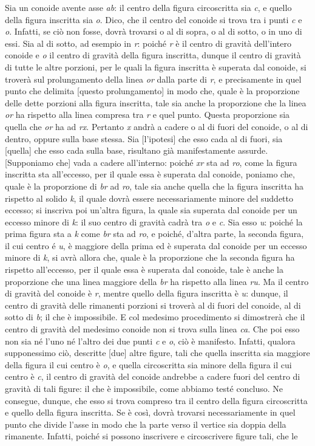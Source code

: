 \documentclass[11pt,twoside,openany]{book}
\begin{document}
Sia un conoide avente asse \emph{ab}: il centro della figura circoscritta sia \emph{c}, e quello della figura inscritta sia \emph{o}. Dico, che il centro del conoide si trova tra i punti \emph{c} e \emph{o}. Infatti, se ciò non fosse, dovrà trovarsi o al di sopra, o al di sotto, o in uno di essi. Sia al di sotto, ad esempio in \emph{r}: poiché \emph{r} è il centro di gravità dell'intero conoide e \emph{o} il centro di gravità della figura inscritta, dunque il centro di gravità di tutte le altre porzioni, per le quali la figura inscritta è superata dal conoide, si troverà sul prolungamento della linea \emph{or} dalla parte di \emph{r}, e precisamente in quel punto che delimita [questo prolungamento] in modo che, quale è la proporzione delle dette porzioni alla figura inscritta, tale sia anche la proporzione che la linea \emph{or} ha rispetto alla linea compresa tra \emph{r} e quel punto. Questa proporzione sia quella che \emph{or} ha ad \emph{rx}. Pertanto \emph{x} andrà a cadere o al di fuori del conoide, o al di dentro, oppure sulla base stessa. Sia [l'ipotesi] che esso cada al di fuori, sia [quella] che esso cada sulla base, risultano già manifestamente assurde. [Supponiamo che] vada a cadere all'interno: poiché \emph{xr} sta ad \emph{ro}, come la figura inscritta sta all'eccesso, per il quale essa è superata dal conoide, poniamo che, quale è la proporzione di \emph{br} ad \emph{ro}, tale sia anche quella che la figura inscritta ha rispetto al solido \emph{k}, il quale dovrà essere necessariamente minore del suddetto eccesso; si inscriva poi un'altra figura, la quale sia superata dal conoide per un eccesso minore di \emph{k}: il suo centro di gravità cadrà tra \emph{o} e \emph{c}. Sia esso \emph{u}: poiché la prima figura sta a \emph{k} come \emph{br} sta ad \emph{ro}, e poiché, d'altra parte, la seconda figura, il cui centro é \emph{u}, è maggiore della prima ed è superata dal conoide per un eccesso minore di \emph{k}, si avrà allora che, quale è la proporzione che la seconda figura ha rispetto all'eccesso, per il quale essa è superata dal conoide, tale è anche la proporzione che una linea maggiore della \emph{br} ha rispetto alla linea \emph{ru}. Ma il centro di gravità del conoide è \emph{r}, mentre quello della figura inscritta è \emph{u}: dunque, il centro di gravità delle rimanenti porzioni si troverà al di fuori del conoide, al di sotto di \emph{b}; il che è impossibile. E col medesimo procedimento si dimostrerà che il centro di gravità del medesimo conoide non si trova sulla linea \emph{ca}. Che poi esso non sia né l'uno né l'altro dei due punti \emph{c} e \emph{o}, ciò è manifesto. Infatti, qualora supponessimo ciò, descritte [due] altre figure, tali che quella inscritta sia maggiore della figura il cui centro è \emph{o}, e quella circoscritta sia minore della figura il cui centro è \emph{c}, il centro di gravità del conoide andrebbe a cadere fuori del centro di gravità di tali figure: il che è impossibile, come abbiamo testé concluso. Ne consegue, dunque, che esso si trova compreso tra il centro della figura circoscritta e quello della figura inscritta. Se è così, dovrà trovarsi necessariamente in quel punto che divide l'asse in modo che la parte verso il vertice sia doppia della rimanente. Infatti, poiché si possono inscrivere e circoscrivere figure tali, che le 
\end{document}
